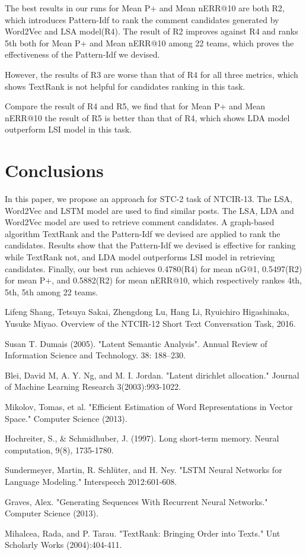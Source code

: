 \documentclass{llncs}
\begin{document}
The best results in our runs for Mean P+ and Mean nERR@10 are both R2, 
which introduces Pattern-Idf to rank the comment candidates generated by 
Word2Vec and LSA model(R4). The result of R2 improves against R4 and ranks 5th 
both for Mean P+ and Mean nERR@10 among 22 teams, which proves the 
effectiveness of the Pattern-Idf we devised. 

However, the results of R3 are worse than that of R4 for all three metrics, 
which shows TextRank is not helpful for candidates ranking in this task.

Compare the result of R4 and R5, we find that for Mean P+ and Mean nERR@10 the 
result of R5 is better than that of R4, which shows LDA model outperform LSI 
model in this task.

\section{Conclusions}
In this paper, we propose an approach for STC-2 task of NTCIR-13. The LSA,
Word2Vec and LSTM model are used to find similar posts. The LSA, LDA and Word2Vec 
model are used to retrieve comment candidates. A graph-based algorithm TextRank 
and the Pattern-Idf we devised are applied to rank the candidates. Results show 
that the Pattern-Idf we devised is effective for ranking while TextRank not, 
and LDA model outperforms LSI model in retrieving candidates. Finally, our best 
run achieves 0.4780(R4) for mean nG@1, 0.5497(R2) for mean P+, and 0.5882(R2) for 
mean nERR@10, which respectively rankes 4th, 5th, 5th among 22 teams. 


%
%
\begin{thebibliography}{5}

Lifeng Shang, Tetsuya Sakai, Zhengdong Lu, Hang Li, Ryuichiro Higashinaka, Yusuke Miyao. 
Overview of the NTCIR-12 Short Text Conversation Task, 2016.

Susan T. Dumais (2005). "Latent Semantic Analysis". Annual Review of Information Science and Technology. 38: 188–230. 

Blei, David M, A. Y. Ng, and M. I. Jordan. "Latent dirichlet allocation." Journal of Machine Learning Research 3(2003):993-1022.

Mikolov, Tomas, et al. "Efficient Estimation of Word Representations in Vector Space." Computer Science (2013).

Hochreiter, S., \& Schmidhuber, J. (1997). Long short-term memory. Neural computation, 9(8), 1735-1780.

Sundermeyer, Martin, R. Schlüter, and H. Ney. "LSTM Neural Networks for Language Modeling." Interspeech 2012:601-608.

Graves, Alex. "Generating Sequences With Recurrent Neural Networks." Computer Science (2013).

Mihalcea, Rada, and P. Tarau. "TextRank: Bringing Order into Texts." Unt Scholarly Works (2004):404-411.

\end{thebibliography}
\end{document}
